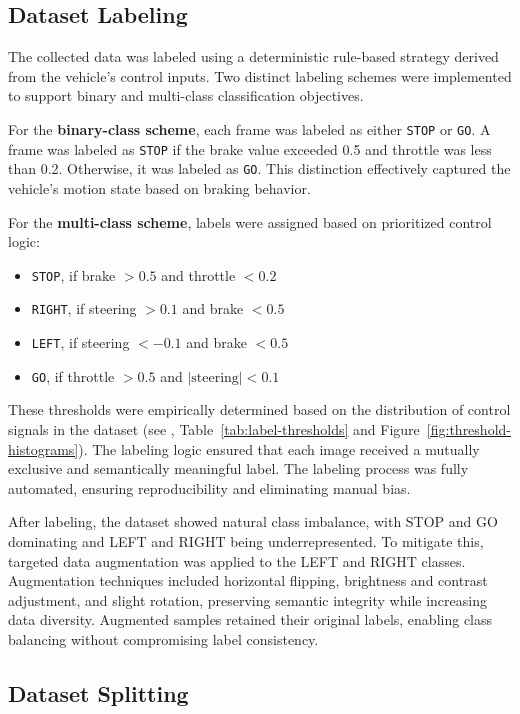 \subsection{Dataset Labeling}

The collected data was labeled using a deterministic rule-based strategy derived from the vehicle’s control inputs. Two distinct labeling schemes were implemented to support binary and multi-class classification objectives.

For the \textbf{binary-class scheme}, each frame was labeled as either \texttt{STOP} or \texttt{GO}. A frame was labeled as \texttt{STOP} if the brake value exceeded 0.5 and throttle was less than 0.2. Otherwise, it was labeled as \texttt{GO}. This distinction effectively captured the vehicle's motion state based on braking behavior.

For the \textbf{multi-class scheme}, labels were assigned based on prioritized control logic:
\begin{itemize}
    \item \texttt{STOP}, if brake $> 0.5$ and throttle $< 0.2$
    \item \texttt{RIGHT}, if steering $> 0.1$ and brake $< 0.5$
    \item \texttt{LEFT}, if steering $< -0.1$ and brake $< 0.5$
    \item \texttt{GO}, if throttle $> 0.5$ and $|\text{steering}| < 0.1$
\end{itemize}


These thresholds were empirically determined based on the distribution of control signals in the dataset (see , Table~\ref{tab:label-thresholds} and Figure~\ref{fig:threshold-histograms}). The labeling logic ensured that each image received a mutually exclusive and semantically meaningful label. The labeling process was fully automated, ensuring reproducibility and eliminating manual bias.

After labeling, the dataset showed natural class imbalance, with STOP and GO dominating and LEFT and RIGHT being underrepresented. To mitigate this, targeted data augmentation was applied to the LEFT and RIGHT classes. Augmentation techniques included horizontal flipping, brightness and contrast adjustment, and slight rotation, preserving semantic integrity while increasing data diversity. Augmented samples retained their original labels, enabling class balancing without compromising label consistency.


\subsection{Dataset Splitting}


